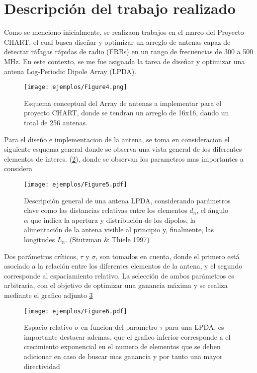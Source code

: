 \section{Descripción del trabajo realizado}
Como se menciono inicialmente, se realizaon trabajos en el marco del Proyecto CHART, el cual busca diseñar y optimizar un arreglo de antenas capaz de detectar ráfagas rápidas de radio (FRBs) en un rango de frecuencias de 300 a 500 MHz. En este contexto, se me fue asignada la tarea de diseñar y optimizar una antena Log-Periodic Dipole Array (LPDA).
\begin{figure}
	\centering
	\texttt{[image: ejemplos/Figure4.png]}
	\caption{Esquema conceptual del Array de antenas a implementar para el proyecto CHART, donde se tendran un arreglo de 16x16, dando un total de 256 antenas.}
	\label{fig:personas_lab}
\end{figure}
Para el diseño e implementacion de la antena, se toma en consideracion el siguiente esquema general donde se observa una vista general de los diferentes elementos de interes. (\ref{fig:esquema_antena}),
donde se observan los parametros mas importantes a considera
\begin{figure}
	\centering
	\texttt{[image: ejemplos/Figure5.pdf]}
	\caption{Descripción general de una antena LPDA, considerando parámetros clave como las distancias relativas entre los elementos \(d_n\), el ángulo \(\alpha\) que indica la apertura y distribución de los dipolos, la alimentación de la antena visible al principio y, finalmente, las longitudes \(L_n\). (Stutzman \& Thiele 1997)}
	\label{fig:esquema_antena}
\end{figure}
Dos parámetros críticos, \(\tau\) y \(\sigma\), son tomados en cuenta, donde el primero está asociado a la relación entre los diferentes elementos de la antena, y el segundo corresponde al espaciamiento relativo. La selección de ambos parámetros es arbitraria, con el objetivo de optimizar una ganancia máxima y se realiza mediante el grafico adjunto \ref{fig:Parametros_antena}
\begin{figure}
	\centering
	\texttt{[image: ejemplos/Figure6.pdf]}
	\caption{Espacio relativo $\sigma$ en funcion del parametro $\tau$ para una  LPDA, es importante destacar ademas, que el grafico inferior corresponde a el crecimiento exponencial en el numero de elementos que se deben adicionar en caso de buscar mas ganancia y por tanto una mayor directividad}
	\label{fig:Parametros_antena}
\end{figure}
